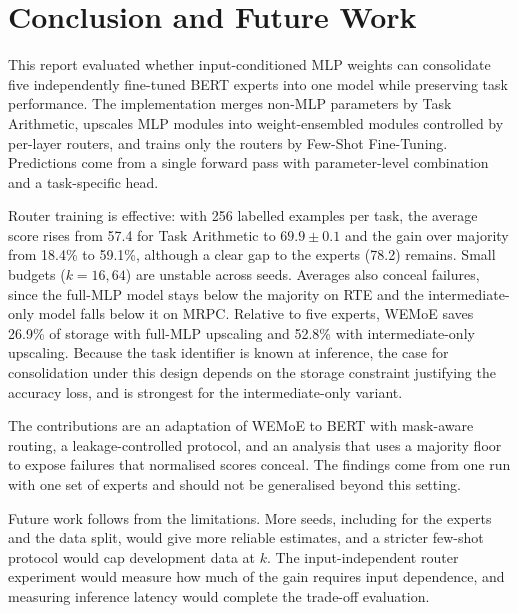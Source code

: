 \chapter{Conclusion and Future Work}

This report evaluated whether input-conditioned MLP weights can consolidate five independently fine-tuned BERT experts into one model while preserving task performance. The implementation merges non-MLP parameters by Task Arithmetic, upscales MLP modules into weight-ensembled modules controlled by per-layer routers, and trains only the routers by Few-Shot Fine-Tuning. Predictions come from a single forward pass with parameter-level combination and a task-specific head.

Router training is effective: with 256 labelled examples per task, the average score rises from 57.4 for Task Arithmetic to $69.9\pm0.1$ and the gain over majority from 18.4\% to 59.1\%, although a clear gap to the experts (78.2) remains. Small budgets ($k=16,64$) are unstable across seeds. Averages also conceal failures, since the full-MLP model stays below the majority on RTE and the intermediate-only model falls below it on MRPC. Relative to five experts, WEMoE saves 26.9\% of storage with full-MLP upscaling and 52.8\% with intermediate-only upscaling. Because the task identifier is known at inference, the case for consolidation under this design depends on the storage constraint justifying the accuracy loss, and is strongest for the intermediate-only variant.

The contributions are an adaptation of WEMoE to BERT with mask-aware routing, a leakage-controlled protocol, and an analysis that uses a majority floor to expose failures that normalised scores conceal. The findings come from one run with one set of experts and should not be generalised beyond this setting.

Future work follows from the limitations. More seeds, including for the experts and the data split, would give more reliable estimates, and a stricter few-shot protocol would cap development data at $k$. The input-independent router experiment would measure how much of the gain requires input dependence, and measuring inference latency would complete the trade-off evaluation.
